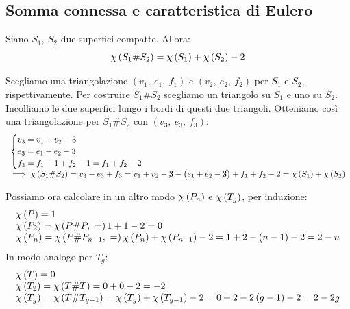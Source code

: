 \subsection{Somma connessa e caratteristica di Eulero}
\begin{lemming}
	Siano $S_1,\ S_2$ due superfici compatte. Allora:
	\begin{equation}
		\euler{S_1\# S_2}{\ }=\euler{S_1}{\ }+\euler{S_2}{\ }-2
	\end{equation}
\vspace{-6mm}
\end{lemming}
\begin{demonstration}
	Scegliamo una triangolazione $\left(v_1,\ e_1,\ f_1\right)$ e $\left(v_2,\ e_2,\ f_2\right)$ per $S_1$ e $S_2$, rispettivamente. Per costruire $S_1\# S_2$ scegliamo un triangolo su $S_1$ e uno su $S_2$. Incolliamo le due superfici lungo i bordi di questi due triangoli. Otteniamo così una triangolazione per $S_1\# S_2$ con $\left(v_3,\ e_3,\ f_3\right)$:
	\begin{equation*}
		\begin{array}{l}
			\begin{cases}
				v_3=v_1+v_2-3\\
				e_3=e_1+e_2-3\\
				f_3=f_1-1+f_2-1=f_1+f_2-2
			\end{cases}\\
			\implies \euler{S_1\# S_2}{\ }=v_3-e_3+f_3=v_1+v_2-\cancel{3}-\left(e_1+e_2-\cancel{3}\right)+f_1+f_2-2=\euler{S_1}{\ }+\euler{S_2}{\ }
		\end{array}
	\end{equation*}
\end{demonstration}
\begin{observe}
	Possiamo ora calcolare in un altro modo $\euler{P_n}{\ }$ e $\euler{T_g}{\ }$, per induzione:
	\begin{equation*}
		\begin{array}{l}
			\euler{P}{\ }=1\\
			\euler{P_2}{\ }=\euler{P\# P}=1+1-2=0\\
			\euler{P_n}{\ }=\euler{P\# P_{n-1}}=\euler{P_n}{\ }+\euler{P_{n-1}}{\ }-2=1+2-\left(n-1\right)-2=2-n
		\end{array}
	\end{equation*}
In modo analogo per $T_g$:
\begin{equation*}
	\begin{array}{l}
		\euler{T}{\ }=0\\
		\euler{T_2}{\ }=\euler{T\# T}{\ }=0+0-2=-2\\
		\euler{T_g}{\ }=\euler{T\# T_{g-1}}{\ }=\euler{T_g}{\ }+\euler{T_{g-1}}{\ }-2=0+2-2\left(g-1\right)-2=2-2g
	\end{array}
\end{equation*}
\vspace{-3mm}
\end{observe}
